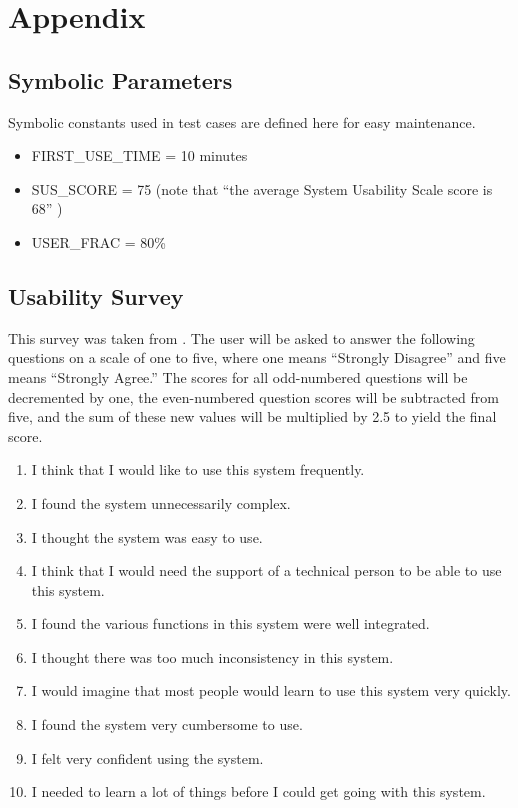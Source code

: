 \documentclass[12pt, titlepage]{article}
\begin{document}

\newpage





\newpage

\section{Appendix}

\subsection{Symbolic Parameters}

Symbolic constants used in test cases are defined here for easy
maintenance.

\begin{itemize}
  \item FIRST\_USE\_TIME = 10 minutes
  \item SUS\_SCORE = 75 (note that ``the average System Usability Scale score
        is 68'' \cite{thomas_how_2015})
  \item USER\_FRAC = 80\%
\end{itemize}

\subsection{Usability Survey} \label{sec_usableSurvey}

This survey was taken from \cite{thomas_how_2015}. The user will be asked to
answer the following questions on a scale of one to five, where one means
``Strongly Disagree'' and five means ``Strongly Agree.'' The scores for all
odd-numbered questions will be decremented by one, the even-numbered question
scores will be subtracted from five, and the sum of these new values will be
multiplied by 2.5 to yield the final score.

\begin{enumerate}
  \item I think that I would like to use this system frequently.
  \item I found the system unnecessarily complex.
  \item I thought the system was easy to use.
  \item I think that I would need the support of a technical person to be able
        to use this system.
  \item I found the various functions in this system were well integrated.
  \item I thought there was too much inconsistency in this system.
  \item I would imagine that most people would learn to use this system very
        quickly.
  \item I found the system very cumbersome to use.
  \item I felt very confident using the system.
  \item I needed to learn a lot of things before I could get going with this
        system.
\end{enumerate}
\end{document}
